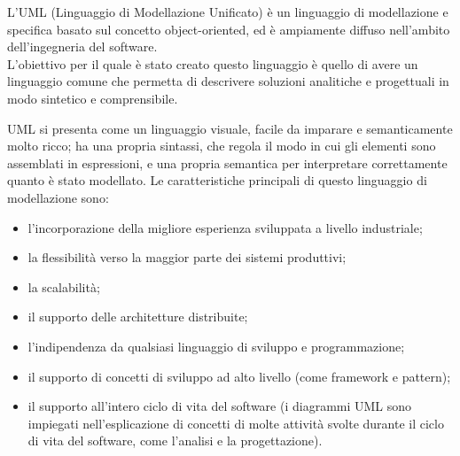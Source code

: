  \label{app:UML}
L'UML (Linguaggio di Modellazione Unificato) è un linguaggio di modellazione e specifica basato sul concetto object-oriented, ed è ampiamente diffuso nell'ambito dell'ingegneria del software.\\
L'obiettivo per il quale è stato creato questo linguaggio è quello di avere un linguaggio comune che permetta di descrivere soluzioni analitiche e progettuali in modo sintetico e comprensibile.

UML si presenta come un linguaggio visuale, facile da imparare e semanticamente molto ricco; ha una propria sintassi, che regola il modo in cui gli elementi sono assemblati in espressioni, e una propria semantica per interpretare correttamente quanto è stato modellato.
Le caratteristiche principali di questo linguaggio di modellazione sono:
\begin{itemize}
	\item l'incorporazione della migliore esperienza sviluppata a livello industriale;
	\item la flessibilità verso la maggior parte dei sistemi produttivi;
	\item la scalabilità;
	\item il supporto delle architetture distribuite;
	\item l'indipendenza da qualsiasi linguaggio di sviluppo e programmazione;
	\item il supporto di concetti di sviluppo ad alto livello (come framework e pattern);
	\item il supporto all'intero ciclo di vita del software (i diagrammi UML sono impiegati nell'esplicazione di concetti di molte attività svolte durante il ciclo di vita del software, come l'analisi e la progettazione).
\end{itemize}

